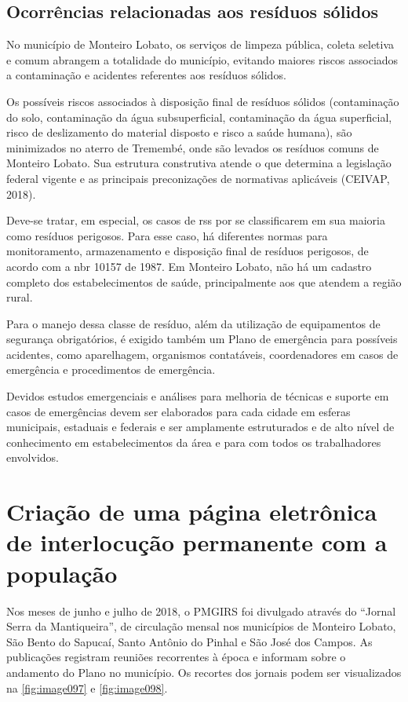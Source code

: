 \subsection{Ocorrências relacionadas aos resíduos sólidos}
No município de Monteiro Lobato, os serviços de limpeza pública, coleta seletiva e comum abrangem a totalidade do município, evitando maiores riscos associados a contaminação e acidentes referentes aos resíduos sólidos.

Os possíveis riscos associados à disposição final de resíduos sólidos (contaminação do solo, contaminação da água subsuperficial, contaminação da água superficial, risco de deslizamento do material disposto e risco a saúde humana), são minimizados no aterro de Tremembé, onde são levados os resíduos comuns de Monteiro Lobato. Sua estrutura construtiva atende o que determina a legislação federal vigente e as principais preconizações de normativas aplicáveis (CEIVAP, 2018).

Deve-se tratar, em especial, os casos de \gls{rss} por se classificarem em sua maioria como resíduos perigosos. Para esse caso, há diferentes normas para monitoramento, armazenamento e disposição final de resíduos perigosos, de acordo com a \gls{nbr} 10157 de 1987. Em Monteiro Lobato, não há um cadastro completo dos estabelecimentos de saúde, principalmente aos que atendem a região rural.

Para o manejo dessa classe de resíduo, além da utilização de equipamentos de segurança obrigatórios, é exigido também um Plano de emergência para possíveis acidentes, como aparelhagem, organismos contatáveis, coordenadores em casos de emergência e procedimentos de emergência.

Devidos estudos emergenciais e análises para melhoria de técnicas e suporte em casos de emergências devem ser elaborados para cada cidade em esferas municipais, estaduais e federais e ser amplamente estruturados e de alto nível de conhecimento em estabelecimentos da área e para com todos os trabalhadores envolvidos.

\newpage
\section{Criação de uma página eletrônica de interlocução permanente com a população}

Nos meses de junho e julho de 2018, o PMGIRS foi divulgado através do “Jornal Serra da Mantiqueira”, de circulação mensal nos municípios de Monteiro Lobato, São Bento do Sapucaí, Santo Antônio do Pinhal e São José dos Campos. As publicações registram reuniões recorrentes à época e informam sobre o andamento do Plano no município. Os recortes dos jornais podem ser visualizados na \autoref{fig:image097} e \autoref{fig:image098}.

